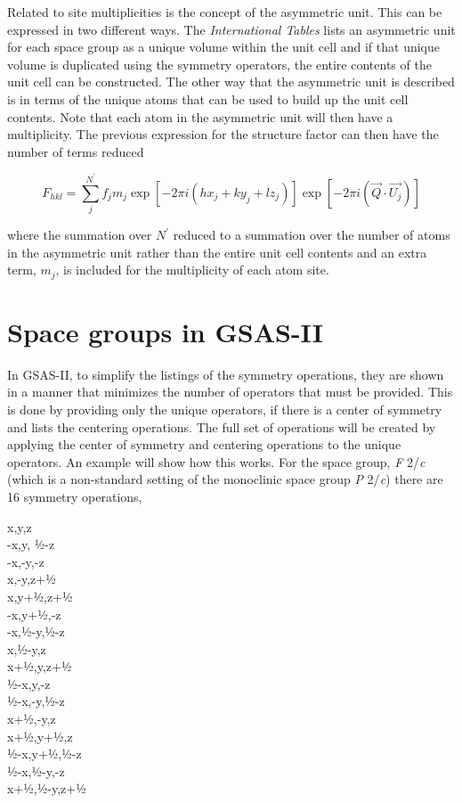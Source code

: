 Related to site multiplicities is the concept of the asymmetric unit. This can be expressed in two different ways. The \textit{International Tables} lists an asymmetric unit for each space group as a unique volume within the unit cell and if that unique volume is duplicated using the symmetry operators, the entire contents of the unit cell can be constructed. The other way that the asymmetric unit is described is in terms of the unique atoms that can be used to build up the unit cell contents. Note that each atom in the asymmetric unit will then have a multiplicity. The previous expression for the structure factor can then have the number of terms reduced

$$F_{hkl}=\sum_j^{N^\prime} f_j m_j\exp⁡[-2\pi i(hx_j + ky_j + lz_j)] \exp⁡[-2\pi i(\vec{Q}\cdot\vec{U_j})]$$

where the summation over $N^\prime$ reduced to a summation over the number of atoms in the asymmetric unit rather than the entire unit cell contents and an extra term, $m_j$, is included for the multiplicity of each atom site. 

\section{Space groups in GSAS-II}

In GSAS-II, to simplify the listings of the symmetry operations, they are shown in a manner that minimizes the number of operators that must be provided. This is done by providing only the unique operators, if there is a center of symmetry and lists the centering operations. The full set of operations will be created by applying the center of symmetry and centering operations to the unique operators. An example will show how this works. For the space group, \textit{F }2/\textit{c} (which is a non-standard setting of the monoclinic space group \textit{P }2/\textit{c}) there are 16 symmetry operations, 
\begin{center}
x,y,z \\
-x,y, ½-z \\
-x,-y,-z\\
x,-y,z+½\\
x,y+½,z+½\\
-x,y+½,-z\\
-x,½-y,½-z\\
x,½-y,z\\
x+½,y,z+½\\
½-x,y,-z\\
½-x,-y,½-z\\
x+½,-y,z\\
x+½,y+½,z\\
½-x,y+½,½-z\\
½-x,½-y,-z\\
x+½,½-y,z+½
\end{center}

